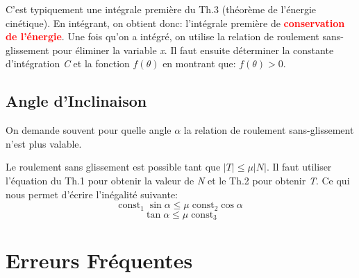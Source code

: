 \documentclass[a4paper]{article}
\begin{document}
C'est typiquement une intégrale première du Th.3 (théorème de l'énergie cinétique). En intégrant, on obtient donc: l’intégrale première de \textcolor{red}{\textbf{conservation de l’énergie}}. Une fois qu'on a intégré, on utilise la relation de roulement sans-glissement pour éliminer la variable \emph{x}. Il faut ensuite déterminer la constante d'intégration \emph{C} et la fonction $ f(\theta) $ en montrant que: $ f(\theta) > 0 $.





\subsection{Angle d'Inclinaison}





On demande souvent pour quelle angle $ \alpha $ la relation de roulement sans-glissement n'est plus valable.

Le roulement sans glissement est possible tant que $ | T | \leq \mu | N | $. Il faut utiliser l'équation du Th.1 pour obtenir la valeur de \emph{N} et le Th.2 pour obtenir \emph{T}. Ce qui nous permet d'écrire l'inégalité suivante:
\[ \text{const}_1 \; \sin \alpha \leq \mu \; \text{const}_2 \cos \alpha \]
\[ \tan \alpha \leq \mu \; \text{const}_3 \]










\section{Erreurs Fréquentes}
\end{document}
